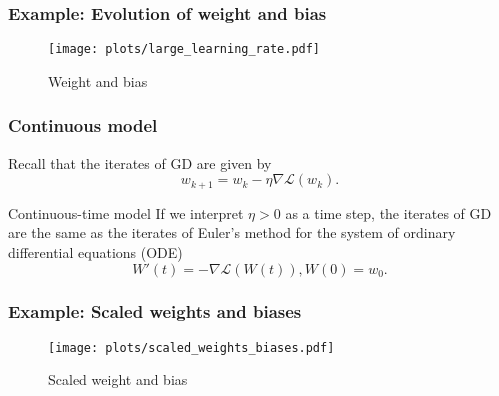 \documentclass[17pt,institute=e10]{tuhh_presentation}
\newcommand{\CL}{\mathcal{L}}
\begin{document}
\begin{frame}[fragile]
  \frametitle{Example: Evolution of weight and bias}
    \vspace{-1cm}
    \begin{figure}
      \centering
      \texttt{[image: plots/large\_learning\_rate.pdf]}
      \caption{Weight and bias}
    \end{figure}
\end{frame}

\begin{frame}[fragile]
  \frametitle{Continuous model}
  Recall that the iterates of GD are given by
  \begin{equation*}
    w_{k+1} = w_k - \eta \nabla \CL(w_k).
  \end{equation*}
  \begin{block}{Continuous-time model}
    If we interpret $\eta > 0$ as a time step, the iterates of GD are the same as the iterates of Euler's method for the system of ordinary differential equations (ODE)
  \begin{equation*}
    W'(t) = - \nabla \CL(W(t)), W(0) = w_0.
  \end{equation*} 
  \end{block}
  
\end{frame}

\begin{frame}[fragile]
  \frametitle{Example: Scaled weights and biases}
    \vspace{-1cm}
    \begin{figure}
      \centering
      \texttt{[image: plots/scaled\_weights\_biases.pdf]}
      \caption{Scaled weight and bias}
    \end{figure}
\end{frame}
\end{document}
